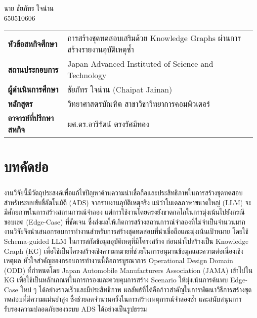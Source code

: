 \documentclass[a4paper,12pt]{report}
\begin{document}
\begin{flushright}
    นาย ชัยภัทร ใจน่าน\\
    650510606
\end{flushright}

{
\cleardoublepage%
\let\clearpage\relax%
\noindent
\begin{tabular}{l p{10cm}}
    \textbf{หัวข้อสหกิจศึกษา} & การสร้างชุดทดสอบเสริมด้วย Knowledge Graphs ผ่านการสร้างรายงานอุบัติเหตุซ้ำ \vspace{0.2cm} \\
    \textbf{สถานประกอบการ} & Japan Advanced Instituted of Science and Technology \vspace{0.2cm}\\
    \textbf{ผู้ดำเนินการศึกษา} & ชัยภัทร ใจน่าน (Chaipat Jainan) \vspace{0.2cm}\\
    \textbf{หลักสูตร} & วิทยาศาสตรบัณฑิต สาขาวิชาวิทยาการคอมพิวเตอร์ \vspace{0.2cm}\\
    \textbf{อาจารย์ที่ปรึกษาสหกิจ} & ผศ.ดร.อารีรัตน์ ตรงรัศมีทอง \vspace{0.2cm}\\
\end{tabular}

\chapter*{บทคัดย่อ}

\paragraph{}
งานวิจัยนี้มีวัตถุประสงค์เพื่อแก้ไขปัญหาด้านความน่าเชื่อถือและประสิทธิภาพในการสร้างชุดทดสอบสำหรับระบบขับขี่อัตโนมัติ (ADS) จากรายงานอุบัติเหตุจริง แม้ว่าโมเดลภาษาขนาดใหญ่ (LLM) จะมีศักยภาพในการสร้างสถานการณ์จำลอง แต่การใช้งานโดยตรงยังขาดกลไกในการมุ่งเน้นไปยังกรณีขอบเขต (Edge-Case) ที่ชัดเจน ซึ่งส่งผลให้เกิดการสร้างสถานการณ์จำลองที่ไม่จำเป็นจำนวนมาก งานวิจัยจึงนำเสนอกรอบการทำงานสำหรับการสร้างชุดทดสอบที่น่าเชื่อถือและมุ่งเน้นเป้าหมาย โดยใช้ Schema-guided LLM ในการสกัดข้อมูลอุบัติเหตุที่มีโครงสร้าง ก่อนนำไปสร้างเป็น Knowledge Graph (KG) เพื่อใช้เป็นโครงสร้างเชิงความหมายที่ช่วยในการอนุมานข้อมูลและความต่อเนื่องเชิงเหตุผล หัวใจสำคัญของกรอบการทำงานนี้คือการบูรณาการ Operational Design Domain (ODD) ที่กำหนดโดย Japan Automobile Manufacturers Association (JAMA) เข้าไปใน KG เพื่อใช้เป็นหลักเกณฑ์ในการกรองและควบคุมการสร้าง Scenario ให้มุ่งเน้นการค้นพบ Edge-Case ใหม่ ๆ ได้อย่างรวดเร็วและมีประสิทธิภาพ ผลลัพธ์ที่ได้คือก้าวสำคัญในการพัฒนาวิธีการสร้างชุดทดสอบที่มีความแม่นยำสูง ซึ่งช่วยลดจำนวนครั้งในการสร้างเหตุการณ์จำลองซ้ำ และสนับสนุนการรับรองความปลอดภัยของระบบ ADS ได้อย่างเป็นรูปธรรม
}
\end{document}
